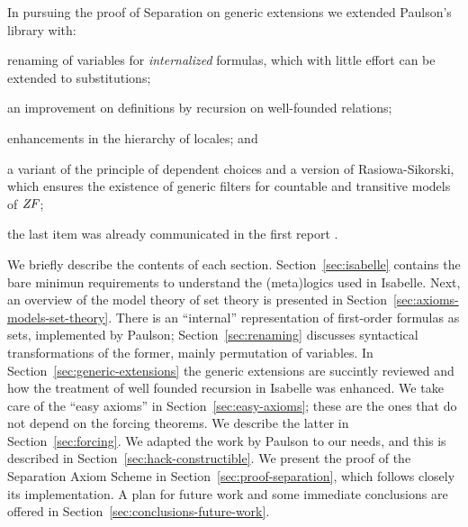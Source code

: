

In pursuing the proof of Separation on generic extensions we
extended Paulson's library with:
\begin{inlinelist}
\item renaming of variables for \emph{internalized} formulas, which
  with little effort can be extended 
  to substitutions;
\item an improvement on definitions by recursion on well-founded
  relations; 
\item enhancements in the hierarchy of locales; and
\item a variant of the  principle of dependent choices and a version
  of Rasiowa-Sikorski, which 
  ensures the existence of generic filters for countable and transitive
  models of $\mathit{ZF}$;
\end{inlinelist} 
the last item was already communicated in the
  first report \cite{2018arXiv180705174G}.
  
We briefly describe the contents of each
section. Section~\ref{sec:isabelle} contains the bare minimun
requirements to understand the (meta)logics used in Isabelle. Next, an
overview of the model theory of set theory is presented in
Section~\ref{sec:axioms-models-set-theory}. There is an ``internal''
representation of first-order formulas as sets, implemented by
Paulson; Section~\ref{sec:renaming} discusses syntactical
transformations of the former, mainly permutation of variables. 
In Section~\ref{sec:generic-extensions} the generic extensions are
succintly reviewed and how the treatment of well founded recursion in
Isabelle was enhanced. We take care of the ``easy axioms'' in
Section~\ref{sec:easy-axioms}; these are the ones that
do not depend on the forcing theorems. We describe the latter in
Section~\ref{sec:forcing}. We adapted the  work by Paulson to our
needs, and this is described in
Section~\ref{sec:hack-constructible}. We present the proof
of the Separation Axiom Scheme in Section~\ref{sec:proof-separation},
which follows closely its implementation. A plan for future work and
some immediate conclusions are offered in
Section~\ref{sec:conclusions-future-work}.


